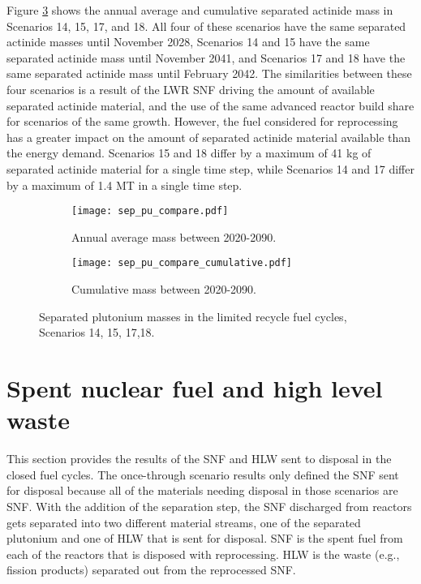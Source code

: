 Figure 
\ref{fig:recycle_sep_pu} shows the annual average and cumulative 
separated actinide mass in Scenarios 14, 15, 17, and 18. All four of 
these scenarios have the same separated actinide masses until 
November 2028, Scenarios 14 and 15 have the same separated actinide 
mass until November 2041, and Scenarios 17 and 18 have the same separated 
actinide mass until February 2042. The similarities between these four 
scenarios is a result of the \gls{LWR} \gls{SNF} driving the amount 
of available separated actinide material, and the use of the 
same advanced reactor build share for scenarios of the same growth. 
However, the fuel considered for reprocessing has a greater impact 
on the amount of separated actinide material available than the 
energy demand. Scenarios 15 and 18 differ by a maximum of 41 kg of 
separated actinide material for a single time step, while Scenarios 
14 and 17 differ by a maximum of 1.4 MT in a single time step. 

\begin{figure}[h!]
    \centering
    \begin{subfigure}[b]{0.49\textwidth}
        \centering
        \texttt{[image: sep\_pu\_compare.pdf]}
        \caption{Annual average mass between 2020-2090.}
        \label{fig:_recycle_sep_pu_all}
    \end{subfigure}
    \hfill
    \begin{subfigure}[b]{0.49\textwidth}
        \centering
        \texttt{[image: sep\_pu\_compare\_cumulative.pdf]}
        \caption{Cumulative mass between 2020-2090.}
        \label{fig:recycle_sep_pu_cumulative}
    \end{subfigure}
       \caption{Separated plutonium masses in the limited 
       recycle fuel cycles, Scenarios 14, 15, 17,18.}
       \label{fig:recycle_sep_pu}
\end{figure}

\section{Spent nuclear fuel and high level waste}
This section provides the results of the \gls{SNF} and \gls{HLW} sent 
to disposal in the closed fuel cycles. The once-through scenario 
results only defined the \gls{SNF} sent for disposal because all 
of the materials needing disposal in those scenarios are \gls{SNF}. 
With the addition of the separation step, the \gls{SNF} discharged 
from reactors gets separated into two different material streams, 
one of the separated plutonium and one of \gls{HLW} that is sent 
for disposal. \gls{SNF} 
is the spent fuel from each of the reactors that is disposed 
with reprocessing. \gls{HLW} is 
the waste (e.g., fission products) separated out from the 
reprocessed \gls{SNF}. 

